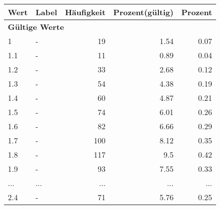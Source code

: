      \begin{longtable}{lXrrr}
     \toprule
     \textbf{Wert} & \textbf{Label} & \textbf{Häufigkeit} & \textbf{Prozent(gültig)} & \textbf{Prozent} \\
     \endhead
     \midrule
     \multicolumn{5}{l}{\textbf{Gültige Werte}}\\
        1 & \multicolumn{1}{X}{-} & %
          \num{19} &
          \num[round-mode=places,round-precision=2]{1.54} &
          \num[round-mode=places,round-precision=2]{0.07} \\
        1.1 & \multicolumn{1}{X}{-} & %
          \num{11} &
          \num[round-mode=places,round-precision=2]{0.89} &
          \num[round-mode=places,round-precision=2]{0.04} \\
        1.2 & \multicolumn{1}{X}{-} & %
          \num{33} &
          \num[round-mode=places,round-precision=2]{2.68} &
          \num[round-mode=places,round-precision=2]{0.12} \\
        1.3 & \multicolumn{1}{X}{-} & %
          \num{54} &
          \num[round-mode=places,round-precision=2]{4.38} &
          \num[round-mode=places,round-precision=2]{0.19} \\
        1.4 & \multicolumn{1}{X}{-} & %
          \num{60} &
          \num[round-mode=places,round-precision=2]{4.87} &
          \num[round-mode=places,round-precision=2]{0.21} \\
        1.5 & \multicolumn{1}{X}{-} & %
          \num{74} &
          \num[round-mode=places,round-precision=2]{6.01} &
          \num[round-mode=places,round-precision=2]{0.26} \\
        1.6 & \multicolumn{1}{X}{-} & %
          \num{82} &
          \num[round-mode=places,round-precision=2]{6.66} &
          \num[round-mode=places,round-precision=2]{0.29} \\
        1.7 & \multicolumn{1}{X}{-} & %
          \num{100} &
          \num[round-mode=places,round-precision=2]{8.12} &
          \num[round-mode=places,round-precision=2]{0.35} \\
        1.8 & \multicolumn{1}{X}{-} & %
          \num{117} &
          \num[round-mode=places,round-precision=2]{9.5} &
          \num[round-mode=places,round-precision=2]{0.42} \\
        1.9 & \multicolumn{1}{X}{-} & %
          \num{93} &
          \num[round-mode=places,round-precision=2]{7.55} &
          \num[round-mode=places,round-precision=2]{0.33} \\
       ... & ... & ... & ... & ... \\
        2.4 & \multicolumn{1}{X}{-} & %
          \num{71} &
          \num[round-mode=places,round-precision=2]{5.76} &
          \num[round-mode=places,round-precision=2]{0.25} \\


\end{longtable}
